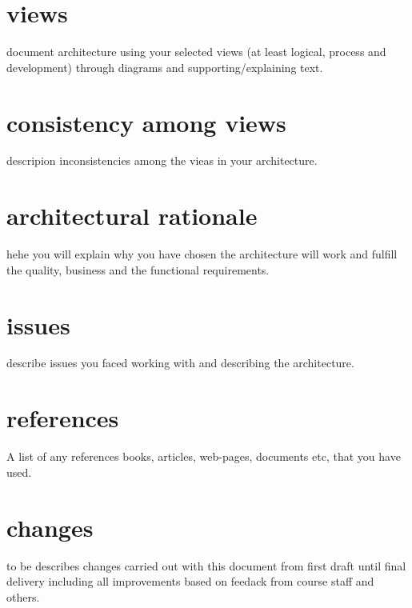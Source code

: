 \documentclass[12pt, a4paper]{article}
\begin{document}
\section{views}
document architecture using your selected views (at least logical, process and development) through diagrams and supporting/explaining text.

\section{consistency among views}
descripion inconsistencies among the vieas in your architecture.

\section{architectural rationale}
hehe you will explain why you have chosen the architecture will work and fulfill the quality, business and the functional requirements.

\section{issues}
describe issues you faced working with and describing the architecture.

\section{references}
A list of any references books, articles, web-pages, documents etc, that you have used. 

\section{changes}
to be describes changes carried out with this document from first draft until final delivery including all improvements based on feedack from course staff and others. 
\end{document}
